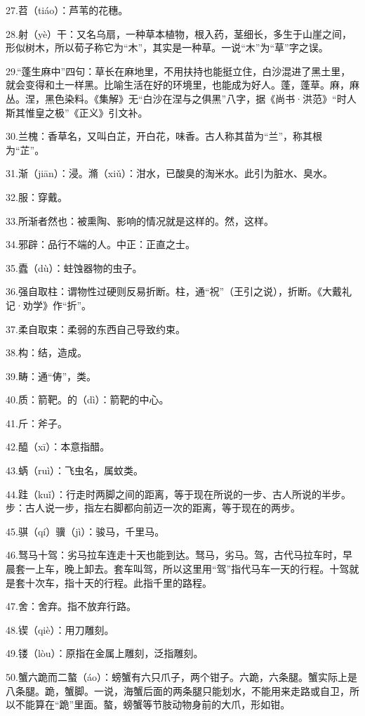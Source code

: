 \documentclass[letterpaper,10pt,english]{sphinxmanual}
\begin{document}
27.苕（tiáo）：芦苇的花穗。

28.射（yè）干：又名乌扇，一种草本植物，根入药，茎细长，多生于山崖之间，形似树木，所以荀子称它为“木”，其实是一种草。一说“木”为“草”字之误。

29.“蓬生麻中”四句：草长在麻地里，不用扶持也能挺立住，白沙混进了黑土里，就会变得和土一样黑。比喻生活在好的环境里，也能成为好人。蓬，蓬草。麻，麻丛。涅，黑色染料。《集解》无“白沙在涅与之俱黑”八字，据《尚书·洪范》“时人斯其惟皇之极”《正义》引文补。

30.兰槐：香草名，又叫白芷，开白花，味香。古人称其苗为“兰”，称其根为“芷”。

31.渐（jiān）：浸。滫（xiǔ）：泔水，已酸臭的淘米水。此引为脏水、臭水。

32.服：穿戴。

33.所渐者然也：被熏陶、影响的情况就是这样的。然，这样。

34.邪辟：品行不端的人。中正：正直之士。

35.蠹（dù）：蛀蚀器物的虫子。

36.强自取柱：谓物性过硬则反易折断。柱，通“祝”（王引之说），折断。《大戴礼记·劝学》作“折”。

37.柔自取束：柔弱的东西自己导致约束。

38.构：结，造成。

39.畴：通“俦”，类。

40.质：箭靶。的（dì）：箭靶的中心。

41.斤：斧子。

42.醯（xī）：本意指醋。

43.蜹（ruì）：飞虫名，属蚊类。

44.跬（kuǐ）：行走时两脚之间的距离，等于现在所说的一步、古人所说的半步。步：古人说一步，指左右脚都向前迈一次的距离，等于现在的两步。

45.骐（qí）骥（jì）：骏马，千里马。

46.驽马十驾：劣马拉车连走十天也能到达。驽马，劣马。驾，古代马拉车时，早晨套一上车，晚上卸去。套车叫驾，所以这里用“驾”指代马车一天的行程。十驾就是套十次车，指十天的行程。此指千里的路程。

47.舍：舍弃。指不放弃行路。

48.锲（qiè）：用刀雕刻。

49.镂（lòu）：原指在金属上雕刻，泛指雕刻。

50.蟹六跪而二螯（áo）：螃蟹有六只爪子，两个钳子。六跪，六条腿。蟹实际上是八条腿。跪，蟹脚。一说，海蟹后面的两条腿只能划水，不能用来走路或自卫，所以不能算在“跪”里面。螯，螃蟹等节肢动物身前的大爪，形如钳。
\end{document}
